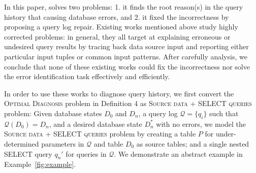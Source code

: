 
In this paper, \sys solves two problems: 1. it finds the root reason(s) in the
query history that causing database errors, and 2. it fixed the incorrectness
by proposing a query log repair. Existing works mentioned above study highly
corrected problems: in general, they all target at explaining erroneous or
undesired query results by tracing back data source input and reporting either
particular input tuples or common input patterns. After carefully analysis, we
conclude that none of these existing works could fix the incorrectness nor
solve the error identification task effectively and efficiently.

In order to use these works to diagnose query history, we first convert the
\textsc{Optimal Diagnosis} problem in Definition 4 as \textsc{Source data +
SELECT queries} problem: Given database states $D_0$ and $D_n$, a query log
$\mathcal{Q} = \{q_i\}$ such that $\mathcal{Q}(D_0) = D_n$, and a desired
database state $D_n^*$ with no errors, we model the \textsc{Source data +
SELECT queries} problem by creating a table $P$ for under-determined
parameters in $\mathcal{Q}$ and table $D_0$ as source tables; and a single
nested SELECT query $q_n'$ for queries in $\mathcal{Q}$. We demonstrate an
abstract example in Example~\ref{fig:example}.


